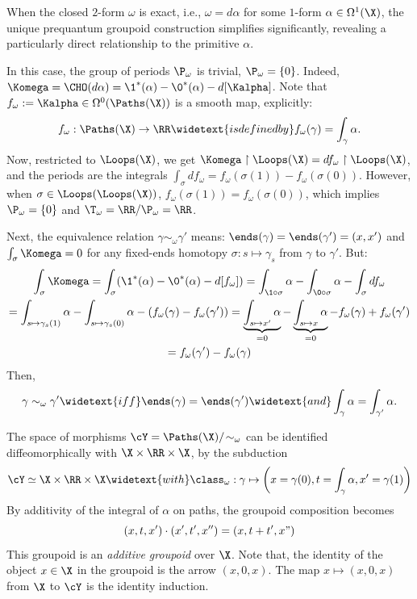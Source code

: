   \begin{article}
    \label{art: Exact Case}
    
    When the closed $2$-form $\omega$ is exact,
    i.e., $\omega = d\alpha$ for some $1$-form $\alpha \in \Omega^1(\X)$,
    the unique prequantum groupoid construction simplifies significantly,
    revealing a particularly direct relationship to the primitive $\alpha$.
    
    In this case,
    the group of periods $\P_\omega$ is trivial,
    $\P_\omega = \{0\}$.
    Indeed,
    $\Komega = \CHO(d\alpha) = \1^*(\alpha) - \0^*(\alpha) - d[\Kalpha]$.
    Note that $f_\omega := \Kalpha \in \Omega^0(\Paths(\X))$ is a smooth map,
    explicitly:
    $$
      f_\omega : \Paths(\X) \to \RR
      \widetext{is defined by}
      f_\omega(\gamma) = \int_\gamma \alpha.
      $$
    Now,
    restricted to $\Loops(\X)$,
    we get $\Komega \restriction \Loops(\X) = df_\omega \restriction \Loops(\X)$,
    and the periods are the integrals
    $\int_\sigma df_\omega = f_\omega(\sigma(1)) - f_\omega(\sigma(0))$.
    However,
    when $\sigma \in \Loops(\Loops(\X))$,
    $f_\omega(\sigma(1)) = f_\omega(\sigma(0))$,
    which implies $\P_\omega = \{0\}$ and $\T_\omega = \RR/\P_\omega = \RR$.
    
    Next,
    the equivalence relation $\gamma \sim_\omega \gamma'$ means:
    $\ends(\gamma) = \ends(\gamma') = (x,x')$ and $\int_\sigma \Komega = 0$ for any fixed-ends homotopy $\sigma : s \mapsto \gamma_s$ from $\gamma$ to $\gamma'$.
    But:
    \begin{multline*}
      \int_\sigma \Komega = \int_\sigma (\1^*(\alpha) - \0^*(\alpha) - d[f_\omega])
      = \int_{\1 \circ \sigma} \alpha -  \int_{\0 \circ \sigma} \alpha - \int_\sigma df_\omega \\
      = \int_{s \mapsto \gamma_s(1)} \alpha -  \int_{s \mapsto \gamma_s(0)} \alpha - (f_\omega(\gamma) - f_\omega(\gamma'))
      = \underbrace{\int_{s \mapsto x'} \alpha}_{=0} - \underbrace{\int_{s \mapsto x} \alpha}_{=0}  - f_\omega(\gamma) + f_\omega(\gamma')\\
      = f_\omega(\gamma') - f_\omega(\gamma)
    \end{multline*}
    Then,
    $$
      \gamma \sim_\omega \gamma'
      \widetext{iff}
      \ends(\gamma) = \ends(\gamma')
      \widetext{and}
      \int_\gamma \alpha = \int_{\gamma'} \alpha.
      $$
    
    The space of morphisms $\cY = \Paths(\X)/\!\sim_\omega$ can be identified diffeomorphically with $\X \times \RR \times \X$,
    by the subduction
    $$
      \cY \simeq \X \times \RR \times \X
      \widetext{with}
      \class_\omega : \gamma \mapsto \left(x = \gamma(0), t = \int_\gamma \alpha,x' = \gamma(1) \right)
      $$
    By additivity of the integral of $\alpha$ on paths,
    the groupoid composition becomes
    $$
      (x,t,x') \cdot (x',t',x'') = (x, t + t', x")
      $$
    This groupoid is an \emph{additive groupoid} over $\X$.
    Note that,
    the identity of the object $x \in \X$ in the groupoid is the arrow $(x,0,x)$.
    The map $x \mapsto (x,0,x)$ from $\X$ to $\cY$ is the identity induction.
    

\end{article}

